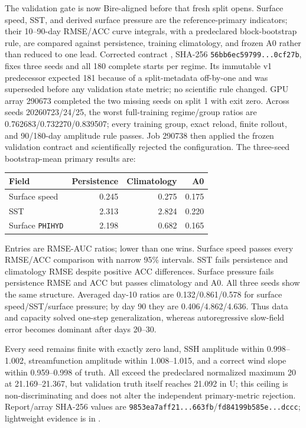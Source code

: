 \documentclass[11pt]{article}
\begin{document}
The validation gate is now Bire-aligned before that fresh split opens.
Surface speed, SST, and derived surface pressure are the reference-primary indicators;
their 10--90-day RMSE/ACC curve integrals, with a predeclared block-bootstrap rule, are
compared against persistence, training climatology, and frozen A0 rather than reduced
to one lead.  Corrected contract
, SHA-256
\texttt{56bb6ec59799...0cf27b}, fixes three seeds and all 180 complete starts per regime.
Its immutable v1 predecessor expected 181 because of a split-metadata off-by-one and
was superseded before any validation state metric; no scientific rule changed.
GPU array 290673 completed the two missing seeds on split 1 with exit zero.  Across
seeds 20260723/24/25, the worst full-training regime/group ratios are
0.762683/0.732270/0.839507; every training group, exact reload, finite rollout, and
90/180-day amplitude rule passes.  Job 290738 then applied the frozen validation
contract and scientifically rejected the configuration.  The three-seed
bootstrap-mean primary results are:
\begin{center}
\begin{tabular}{@{}lrrr@{}}
\toprule
Field & Persistence & Climatology & A0 \\
\midrule
Surface speed & 0.245 & 0.275 & 0.175 \\
SST & 2.313 & 2.824 & 0.220 \\
Surface \texttt{PHIHYD} & 2.198 & 0.682 & 0.165 \\
\bottomrule
\end{tabular}
\end{center}
Entries are RMSE-AUC ratios; lower than one wins.  Surface speed passes every RMSE/ACC
comparison with narrow 95\% intervals.  SST fails persistence and climatology RMSE
despite positive ACC differences.  Surface pressure fails persistence RMSE and ACC
but passes climatology and A0.  All three seeds show the same structure.  Averaged
day-10 ratios are 0.132/0.861/0.578 for surface speed/SST/surface pressure; by day 90
they are 0.406/4.862/4.636.  Thus data and capacity solved one-step generalization,
whereas autoregressive slow-field error becomes dominant after days 20--30.

Every seed remains finite with exactly zero land, SSH amplitude within 0.998--1.002,
streamfunction amplitude within 1.008--1.015, and a correct wind slope within
0.959--0.998 of truth.  All exceed the predeclared normalized maximum 20 at
21.169--21.367, but validation truth itself reaches 21.092 in U; this ceiling is
non-discriminating and does not alter the independent primary-metric rejection.
Report/array SHA-256 values are
\texttt{9853ea7aff21...663fb}/\texttt{fd84199b585e...dccc}; lightweight evidence is in
.
\end{document}
